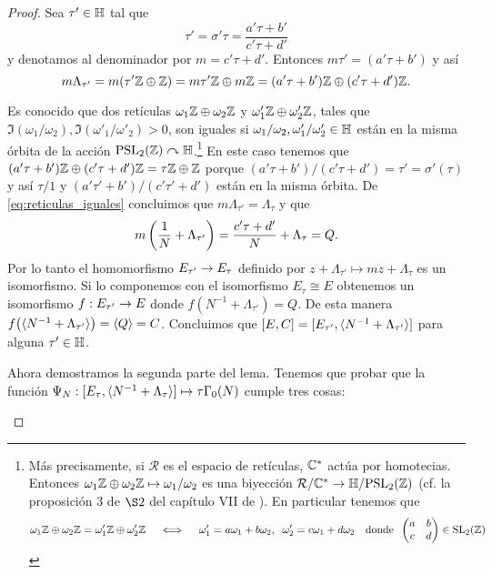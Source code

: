 \begin{proof}
Sea $\tau'\in\mathbb{H}$ tal que
\begin{equation}\label{eq:def_de_matriz_sigma}
  \tau'=\sigma'\tau=\frac{a'\tau+b'}{c'\tau+d'}
\end{equation}
y denotamos al denominador por $m=c'\tau+d'$. Entonces $m\tau'=(a'\tau+b')$ y así
\begin{equation}\label{eq:reticulas_iguales}
	m\Lambda_{\tau'}=
	m(\tau'\mathbb{Z}\oplus\mathbb{Z})=
	m\tau'\mathbb{Z}\oplus m\mathbb{Z}=
	(a'\tau+b')\mathbb{Z}\oplus(c'\tau+d')\mathbb{Z}.
\end{equation}

Es conocido que dos retículas $\omega_1\mathbb{Z}\oplus\omega_2\mathbb{Z}$ y $\omega'_1\mathbb{Z}\oplus\omega'_2\mathbb{Z}$, tales que $\Im(\omega_1/\omega_2),\Im(\omega'_1/\omega'_2)>0$, son iguales si $\omega_1/\omega_2,\omega'_1/\omega'_2\in\mathbb{H}$ están en la misma órbita de la acción $\mathrm{PSL}_2(\mathbb{Z})\curvearrowright\mathbb{H}$.\footnote{\label{foot:reticulas}Más precisamente, si $\mathcal{R}$ es el espacio de retículas, $\mathbb{C}^*$ actúa por homotecias. Entonces $\omega_1\mathbb{Z}\oplus\omega_2\mathbb{Z}\mapsto \omega_1/\omega_2$ es una biyección $\mathcal{R}/\mathbb{C}^*\rightarrow\mathbb{H}/\mathrm{PSL}_2(\mathbb{Z})$ (cf. la proposición 3 de $\S2$ del capítulo VII de \cite{SerreACIA}). En particular tenemos que
\[
	\omega_1\mathbb{Z}\oplus\omega_2\mathbb{Z}=\omega'_1\mathbb{Z}\oplus\omega'_2\mathbb{Z} \quad\iff\quad
	\omega'_1=a\omega_1+b\omega_2,\;\;\omega'_2=c\omega_1+d\omega_2\quad\text{donde}\;\;\begin{pmatrix}a & b\\ c & d\end{pmatrix}\in\mathrm{SL}_2(\mathbb{Z})
\]} En este caso tenemos que $(a'\tau+b')\mathbb{Z}\oplus(c'\tau+d')\mathbb{Z}=\tau\mathbb{Z}\oplus\mathbb{Z}$ porque $(a'\tau+b')/(c'\tau+d')=\tau'=\sigma'(\tau)$ y así $\tau/1$ y $(a'\tau'+b')/(c'\tau'+d')$ están en la misma órbita. De \eqref{eq:reticulas_iguales} concluimos que $m\Lambda_{\tau'}=\Lambda_{\tau}$ y que
\[
	m\left( \frac{1}{N}+\Lambda_{\tau'} \right)=\frac{c'\tau+d'}{N}+\Lambda_\tau=Q.
\]
Por lo tanto el homomorfismo $E_{\tau'}\rightarrow E_\tau$ definido por $z+\Lambda_{\tau'}\mapsto mz+\Lambda_{\tau}$ es un isomorfismo. Si lo componemos con el isomorfismo $E_\tau\cong E$ obtenemos un isomorfismo $f:E_{\tau'}\rightarrow E$ donde $f(N^{-1}+\Lambda_{\tau'})=Q$. De esta manera $f\big(\langle N^{-1}+\Lambda_{\tau'} \rangle\big)=\langle Q \rangle=C$. Concluimos que $[E,C]=[E_{\tau'},\langle N^{-1}+\Lambda_{\tau'} \rangle]$ para alguna $\tau'\in\mathbb{H}$.

Ahora demostramos la segunda parte del lema. Tenemos que probar que la función $\Psi_N:[E_\tau,\langle N^{-1}+\Lambda_\tau \rangle]\mapsto\tau\Gamma_0(N)$ cumple tres cosas:
\begin{enumerate}[label=\emph{\roman*})]


\end{enumerate}
\end{proof}
